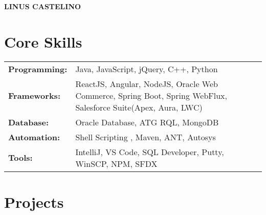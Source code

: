 \documentclass[letter]{twentysecondcv}
\begin{document}
{\fontsize{28pt}{12pt}\selectfont\color{mainblue}\textbf{LINUS CASTELINO}} \\

\fontsize{12pt}{11pt}
\makeprofile %

\section{Core Skills}

\begin{tabular}{p{3cm}p{10cm}}
    \textbf{Programming:} & {Java, JavaScript, jQuery, C++, Python}\\
    \textbf{Frameworks:} & {ReactJS, Angular, NodeJS, Oracle Web Commerce, Spring Boot, Spring WebFlux, Salesforce Suite(Apex, Aura, LWC)}\\ 
    \textbf{Database:} & {Oracle Database, ATG RQL, MongoDB}\\
    \textbf{Automation:} & {Shell Scripting , Maven, ANT, Autosys}\\
    \textbf{Tools:} & {IntelliJ, VS Code, SQL Developer, Putty, WinSCP, NPM, SFDX}
    \vspace{5mm}
\end{tabular}

\section{Projects}
\end{document}
